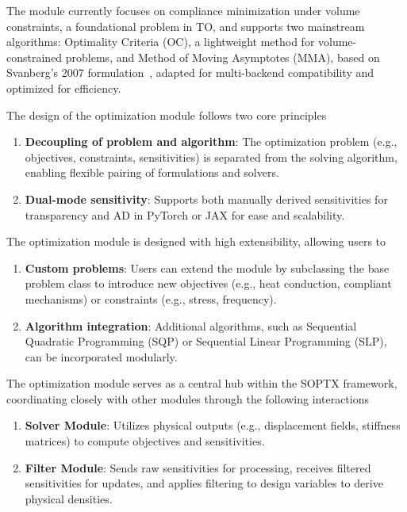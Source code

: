 \documentclass[mathpazo]{cicp}
\begin{document}
The module currently focuses on compliance minimization under volume constraints, a foundational problem in TO, and supports two mainstream algorithms: Optimality Criteria (OC), a lightweight method for volume-constrained problems, and Method of Moving Asymptotes (MMA), based on Svanberg’s 2007 formulation~\cite{Svanberg2007MmaAG}, adapted for multi-backend compatibility and optimized for efficiency.

The design of the optimization module follows two core principles
\vspace{-0.5ex} %
\begin{enumerate}
	\item \textbf{Decoupling of problem and algorithm}: The optimization problem (e.g., objectives, constraints, sensitivities) is separated from the solving algorithm, enabling flexible pairing of formulations and solvers.
	\item \textbf{Dual-mode sensitivity}: Supports both manually derived sensitivities for transparency and AD in PyTorch or JAX for ease and scalability.
\end{enumerate}
\vspace{-0.5ex} %

The optimization module is designed with high extensibility, allowing users to
\vspace{-0.5ex} %
\begin{enumerate}
	\item \textbf{Custom problems}: Users can extend the module by subclassing the base problem class to introduce new objectives (e.g., heat conduction, compliant mechanisms) or constraints (e.g., stress, frequency).
	\item \textbf{Algorithm integration}: Additional algorithms, such as Sequential Quadratic Programming (SQP) or Sequential Linear Programming (SLP), can be incorporated modularly.
\end{enumerate}
\vspace{-0.5ex} %

The optimization module serves as a central hub within the SOPTX framework, coordinating closely with other modules through the following interactions
\vspace{-0.5ex} %
\begin{enumerate}
	\item \textbf{Solver Module}: Utilizes physical outputs (e.g., displacement fields, stiffness matrices) to compute objectives and sensitivities.
	\item \textbf{Filter Module}: Sends raw sensitivities for processing, receives filtered sensitivities for updates, and applies filtering to design variables to derive physical densities.
\end{enumerate}
\vspace{-0.5ex} %
\end{document}

